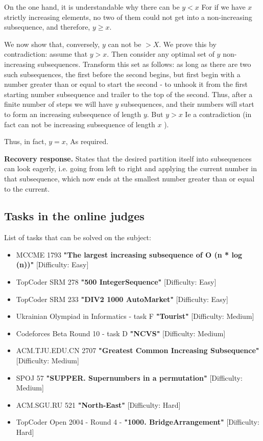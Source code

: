 On the one hand, it is understandable why there can be $y <x$ For if we have $x$ strictly increasing elements, no two of them could not get into a non-increasing subsequence, and therefore, $y \ge x$.

We now show that, conversely, $y$ can not be $> X$. We prove this by contradiction: assume that $y> x$. Then consider any optimal set of $y$ non-increasing subsequences. Transform this set as follows: as long as there are two such subsequences, the first before the second begins, but first begin with a number greater than or equal to start the second - to unhook it from the first starting number subsequence and trailer to the top of the second. Thus, after a finite number of steps we will have $y$ subsequences, and their numbers will start to form an increasing subsequence of length $y$. But $y> x$ Ie a contradiction (in fact can not be increasing subsequence of length $x$ ).

Thus, in fact, $y = x$, As required.

\textbf{Recovery response.} States that the desired partition itself into subsequences can look eagerly, i.e. going from left to right and applying the current number in that subsequence, which now ends at the smallest number greater than or equal to the current.

\subsection{ Tasks in the online judges }

List of tasks that can be solved on the subject:

\begin{itemize}
\item MCCME 1793 \textbf{"The largest increasing subsequence of O (n * log (n))"} [Difficulty: Easy]

\item TopCoder SRM 278 \textbf{"500 IntegerSequence"} [Difficulty: Easy]

\item TopCoder SRM 233 \textbf{"DIV2 1000 AutoMarket"} [Difficulty: Easy]

\item Ukrainian Olympiad in Informatics - task F \textbf{"Tourist"} [Difficulty: Medium]

\item Codeforces Beta Round 10 - task D \textbf{"NCVS"} [Difficulty: Medium]

\item ACM.TJU.EDU.CN 2707 \textbf{"Greatest Common Increasing Subsequence"} [Difficulty: Medium]

\item SPOJ 57 \textbf{"SUPPER. Supernumbers in a permutation"} [Difficulty: Medium]

\item ACM.SGU.RU 521 \textbf{"North-East"} [Difficulty: Hard]

\item TopCoder Open 2004 - Round 4 - \textbf{"1000. BridgeArrangement"} [Difficulty: Hard]
\end{itemize}

